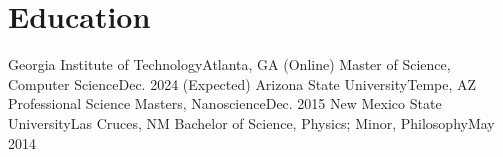 \section{Education}
  \resumeSubHeadingListStart
    \resumeSubheading
      {Georgia Institute of Technology}{Atlanta, GA (Online)}
      {Master of Science, Computer Science}{Dec. 2024 (Expected)}
      \resumeItemListStart
      \resumeItemListEnd
    \resumeSubheading
      {Arizona State University}{Tempe, AZ}
      {Professional Science Masters, Nanoscience}{Dec. 2015}
      \resumeItemListStart
      \resumeItemListEnd
    \resumeSubheading
      {New Mexico State University}{Las Cruces, NM}
      {Bachelor of Science, Physics; Minor, Philosophy}{May 2014}
      \resumeItemListStart
      \resumeItemListEnd
  \resumeSubHeadingListEnd
